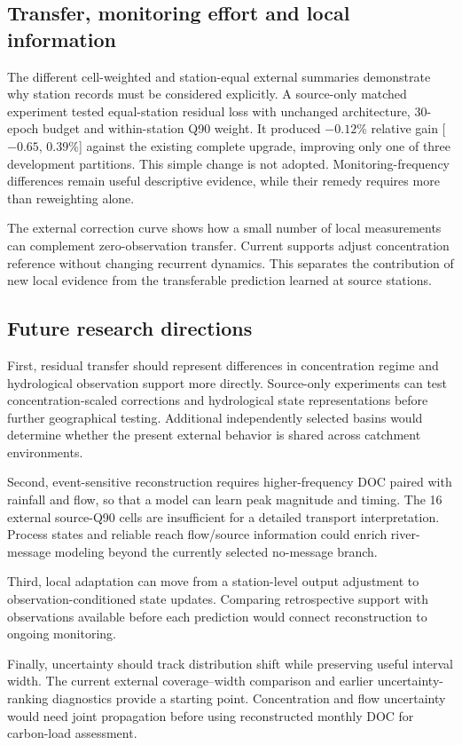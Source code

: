 \documentclass[11pt]{article}
\begin{document}
\subsection{Transfer, monitoring effort and local information}
The different cell-weighted and station-equal external summaries demonstrate why station records must be considered explicitly. A source-only matched experiment tested equal-station residual loss with unchanged architecture, 30-epoch budget and within-station Q90 weight. It produced $-0.12$\% relative gain [$-0.65$, 0.39\%] against the existing complete upgrade, improving only one of three development partitions. This simple change is not adopted. Monitoring-frequency differences remain useful descriptive evidence, while their remedy requires more than reweighting alone.

The external correction curve shows how a small number of local measurements can complement zero-observation transfer. Current supports adjust concentration reference without changing recurrent dynamics. This separates the contribution of new local evidence from the transferable prediction learned at source stations.

\subsection{Future research directions}
First, residual transfer should represent differences in concentration regime and hydrological observation support more directly. Source-only experiments can test concentration-scaled corrections and hydrological state representations before further geographical testing. Additional independently selected basins would determine whether the present external behavior is shared across catchment environments.

Second, event-sensitive reconstruction requires higher-frequency DOC paired with rainfall and flow, so that a model can learn peak magnitude and timing. The 16 external source-Q90 cells are insufficient for a detailed transport interpretation. Process states and reliable reach flow/source information could enrich river-message modeling beyond the currently selected no-message branch.

Third, local adaptation can move from a station-level output adjustment to observation-conditioned state updates. Comparing retrospective support with observations available before each prediction would connect reconstruction to ongoing monitoring.

Finally, uncertainty should track distribution shift while preserving useful interval width. The current external coverage--width comparison and earlier uncertainty-ranking diagnostics provide a starting point. Concentration and flow uncertainty would need joint propagation before using reconstructed monthly DOC for carbon-load assessment.
\end{document}
